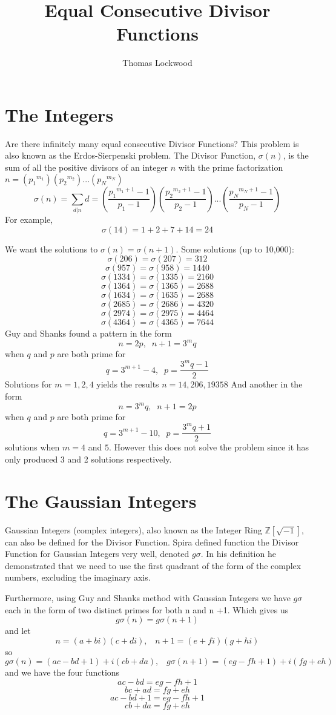 \documentclass[12pt]{amsart}
\title{Equal Consecutive Divisor Functions}
\author{Thomas Lockwood}
\begin{document}
\maketitle
\thispagestyle{empty}


\section{The Integers}
Are there infinitely many equal consecutive Divisor Functions? This problem is also known as the Erdos-Sierpenski problem. The Divisor Function, $\sigma(n)$, is the sum of all the positive divisors of an integer $n$ with the prime factorization $n = ({p_1}^{m_1})({p_2}^{m_2})...({p_N}^{m_N})$ $$\sigma(n) = \sum_{d|{n}}d = (\frac{{p_1}^{m_1+1} - 1} {{p_1} - 1}) (\frac{{p_2}^{m_2+1} - 1}{{p_2} - 1})... (\frac{{p_N}^{m_N+1} - 1}{{p_N} - 1}) $$ For example, $$\sigma(14) = 1 + 2 + 7 + 14 = 24$$

We want the solutions to $\sigma(n) = \sigma(n+1)$. Some solutions (up to 10,000):
\\
$$\sigma(206) = \sigma(207) = 312$$
$$\sigma(957) = \sigma(958) = 1440$$
$$\sigma(1334) = \sigma(1335) = 2160$$
$$\sigma(1364) = \sigma(1365) = 2688$$
$$\sigma(1634) = \sigma(1635) = 2688$$
$$\sigma(2685) = \sigma(2686) = 4320$$
$$\sigma(2974) = \sigma(2975) = 4464$$
$$\sigma(4364) = \sigma(4365) = 7644$$
Guy and Shanks found a pattern in the form $$n = 2p,\; \; n + 1 = 3^{m}q$$ when $q$ and $p$ are both prime for $$q = 3^{m+1} - 4, \; \; p=\frac{3^{m}q-1} {2}$$ Solutions for $m = 1, 2, 4$ yields the results $n = 14, 206, 19358$
And another in the form $$n = 3^{m}q, \; \; n+1 = 2p$$ when $q$ and $p$ are both prime for $$q = 3^{m+1} - 10, \; \; p = \frac{3^{m}q + 1} {2}$$  solutions when $m = 4$ and $5$. However this does not solve the problem since it has only produced 3 and 2 solutions respectively.

\section{The Gaussian Integers}
Gaussian Integers (complex integers), also known as the Integer Ring $\mathds{Z}[\sqrt{-1}]$, can also be defined for the Divisor Function. Spira defined function the Divisor Function for Gaussian Integers very well, denoted $g\sigma$. In his definition he demonstrated that we need to use the first quadrant of the form of the complex numbers, excluding the imaginary axis. 

Furthermore, using Guy and Shanks method with Gaussian Integers we have $g\sigma$ each in the form of two distinct primes for both n and n +1. Which gives us $$g\sigma(n) = g\sigma(n+1)$$
and let $$n = (a + bi)(c+di), \; \; \; n+1 = (e + fi)(g + hi)$$ so $$ g\sigma(n) = (ac -bd + 1) + i(cb + da) , \; \; \; g\sigma(n+1) = (eg - fh + 1) + i(fg + eh)$$ and we have the four functions $$ac -bd = eg -fh + 1$$ $$bc + ad = fg + eh$$ $$ac - bd + 1 = eg - fh + 1$$ $$cb + da = fg + eh$$
\end{document}
